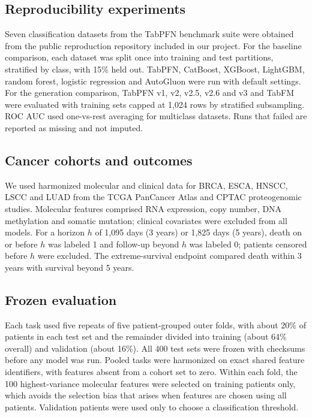 \documentclass[pdflatex,sn-nature]{sn-jnl}
\begin{document}
\subsection*{Reproducibility experiments}
Seven classification datasets from the TabPFN benchmark suite were obtained from the public reproduction repository included in our project. For the baseline comparison, each dataset was split once into training and test partitions, stratified by class, with 15\% held out. TabPFN, CatBoost, XGBoost, LightGBM, random forest, logistic regression and AutoGluon were run with default settings. For the generation comparison, TabPFN v1, v2, v2.5, v2.6 and v3 and TabFM were evaluated with training sets capped at 1,024 rows by stratified subsampling. ROC AUC used one-vs-rest averaging for multiclass datasets. Runs that failed are reported as missing and not imputed.

\subsection*{Cancer cohorts and outcomes}
We used harmonized molecular and clinical data for BRCA, ESCA, HNSCC, LSCC and LUAD from the TCGA PanCancer Atlas and CPTAC proteogenomic studies.\citep{tcga2012brca,tcga2017esca,tcga2015hnsc,tcga2012lusc,tcga2014luad,liu2018clinical,li2023pancancer} Molecular features comprised RNA expression, copy number, DNA methylation and somatic mutation; clinical covariates were excluded from all models. For a horizon $h$ of 1,095 days (3 years) or 1,825 days (5 years), death on or before $h$ was labeled 1 and follow-up beyond $h$ was labeled 0; patients censored before $h$ were excluded. The extreme-survival endpoint compared death within 3 years with survival beyond 5 years.

\subsection*{Frozen evaluation}
Each task used five repeats of five patient-grouped outer folds, with about 20\% of patients in each test set and the remainder divided into training (about 64\% overall) and validation (about 16\%). All 400 test sets were frozen with checksums before any model was run. Pooled tasks were harmonized on exact shared feature identifiers, with features absent from a cohort set to zero. Within each fold, the 100 highest-variance molecular features were selected on training patients only, which avoids the selection bias that arises when features are chosen using all patients.\citep{ambroise2002selection} Validation patients were used only to choose a classification threshold.
\end{document}
